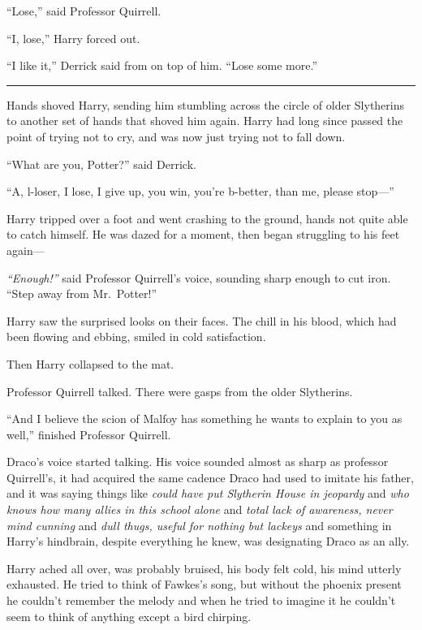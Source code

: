 ``Lose,'' said Professor Quirrell.

``I, lose,'' Harry forced out.

``I like it,'' Derrick said from on top of him. ``Lose some more.''

\begin{center}\rule{3in}{0.4pt}\end{center}

Hands shoved Harry, sending him stumbling across the circle of older
Slytherins to another set of hands that shoved him again. Harry had long
since passed the point of trying not to cry, and was now just trying not
to fall down.

``What are you, Potter?'' said Derrick.

``A, l-loser, I lose, I give up, you win, you're b-better, than me,
please stop---''

Harry tripped over a foot and went crashing to the ground, hands not
quite able to catch himself. He was dazed for a moment, then began
struggling to his feet again---

\emph{``Enough!''} said Professor Quirrell's voice, sounding sharp
enough to cut iron. ``Step away from Mr.~Potter!''

Harry saw the surprised looks on their faces. The chill in his blood,
which had been flowing and ebbing, smiled in cold satisfaction.

Then Harry collapsed to the mat.

Professor Quirrell talked. There were gasps from the older Slytherins.

``And I believe the scion of Malfoy has something he wants to explain to
you as well,'' finished Professor Quirrell.

Draco's voice started talking. His voice sounded almost as sharp as
professor Quirrell's, it had acquired the same cadence Draco had used to
imitate his father, and it was saying things like \emph{could have put
Slytherin House in jeopardy} and \emph{who knows how many allies in this
school alone} and \emph{total lack of awareness, never mind cunning} and
\emph{dull thugs, useful for nothing but lackeys} and something in
Harry's hindbrain, despite everything he knew, was designating Draco as
an ally.

Harry ached all over, was probably bruised, his body felt cold, his mind
utterly exhausted. He tried to think of Fawkes's song, but without the
phoenix present he couldn't remember the melody and when he tried to
imagine it he couldn't seem to think of anything except a bird chirping.


